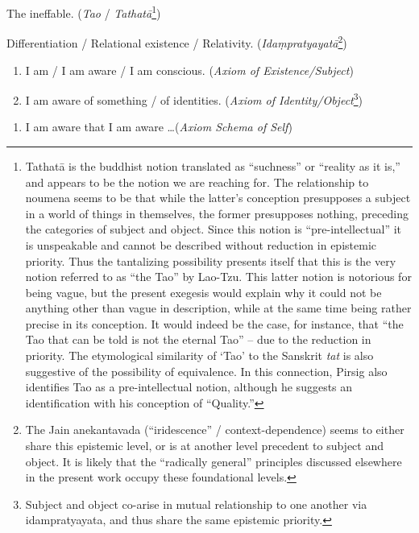 \documentclass[pra,twocolumn,groupedaddress,10pt]{revtex4}
\theoremstyle{definition}
\begin{document}
\begin{enumerate}[label={[\textbf{\arabic*}]},start=0]
	\item The ineffable. (\emph{Tao} / \emph{Tathat\={a}}\footnote{Tathat\={a} is the buddhist notion translated as ``suchness'' or ``reality as it is,'' and appears to be the notion we are reaching for. The relationship to noumena seems to be that while the latter's conception presupposes a subject in a world of things in themselves, the former presupposes nothing, preceding the categories of subject and object. Since this notion is ``pre-intellectual'' it is unspeakable and cannot be described without reduction in epistemic priority. Thus the tantalizing possibility presents itself that this is the very notion referred to as ``the Tao'' by Lao-Tzu\cite{taoteching}. This latter notion is notorious for being vague, but the present exegesis would explain why it could not be anything other than vague in description, while at the same time being rather precise in its conception. It would indeed be the case, for instance, that ``the Tao that can be told is not the eternal Tao'' -- due to the reduction in priority. The etymological similarity of `Tao' to the Sanskrit \emph{tat} is also suggestive of the possibility of equivalence. In this connection, Pirsig\cite{pirsig} also identifies Tao as a pre-intellectual notion, although he suggests an identification with his conception of ``Quality.''})
	\item Differentiation / Relational existence / Relativity. (\emph{Ida\d{m}pratyayat\={a}}\footnote{The Jain anekantavada (``iridescence'' / context-dependence) seems to either share this epistemic level, or is at another level precedent to subject and object. It is likely that the ``radically general'' principles discussed elsewhere in the present work occupy these foundational levels.})
	\item \begin{enumerate}
			\item I am / I am aware / I am conscious. (\emph{Axiom of Existence/Subject})
			\item I am aware of something / of identities. (\emph{Axiom of Identity/Object}\footnote{Subject and object co-arise in mutual relationship to one another via idampratyayata, and thus share the same epistemic priority.})
		\end{enumerate}
	\item \begin{enumerate}
			\item I am aware that I am aware \ldots (\emph{Axiom Schema of Self})

\end{enumerate}
\end{enumerate}
\end{document}

